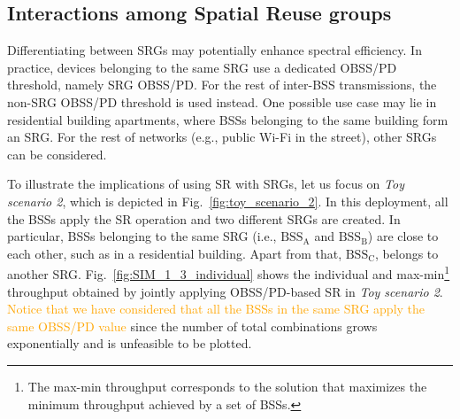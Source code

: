\documentclass{ieeeaccess}
\begin{document}
\subsection{Interactions among Spatial Reuse groups}
\label{section:advanced_interactions}
Differentiating between SRGs may potentially enhance spectral efficiency. In practice, devices belonging to the same SRG use a dedicated OBSS/PD threshold, namely SRG OBSS/PD. For the rest of inter-BSS transmissions, the non-SRG OBSS/PD threshold is used instead. One possible use case may lie in residential building apartments, where BSSs belonging to the same building form an SRG. For the rest of networks (e.g., public Wi-Fi in the street), other SRGs can be considered. 

To illustrate the implications of using SR with SRGs, let us focus on \emph{Toy scenario 2}, which is depicted in Fig.~\ref{fig:toy_scenario_2}. In this deployment, all the BSSs apply the SR operation and two different SRGs are created. In particular, BSSs belonging to the same SRG (i.e., $\text{BSS}_\text{A}$ and $\text{BSS}_\text{B}$) are close to each other, such as in a residential building. Apart from that, $\text{BSS}_\text{C}$, belongs to another SRG. Fig.~\ref{fig:SIM_1_3_individual} shows the individual and max-min\footnote{The max-min throughput corresponds to the solution that maximizes the minimum throughput achieved by a set of BSSs.} throughput obtained by jointly applying OBSS/PD-based SR in \emph{Toy scenario 2}. \textcolor{orange}{Notice that we have considered that all the BSSs in the same SRG apply the same OBSS/PD value} since the number of total combinations grows exponentially and is unfeasible to be plotted. 
\end{document}
